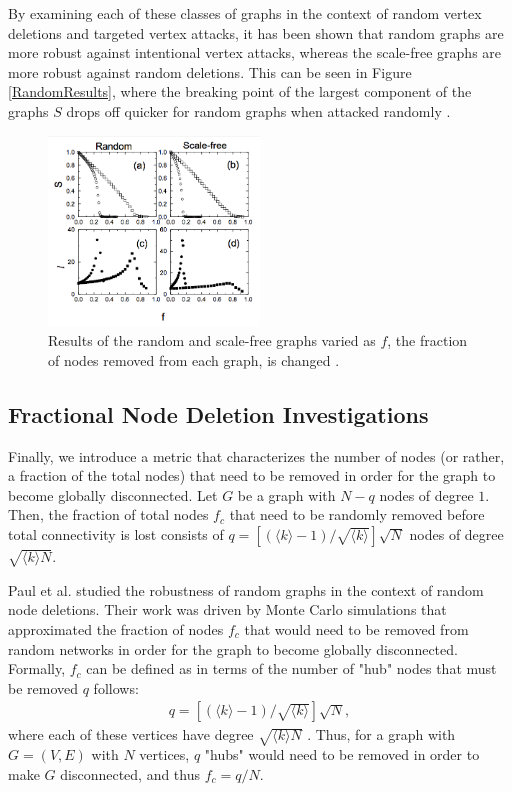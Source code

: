 \documentclass[11pt]{article}
\begin{document}
By examining each of these classes of graphs in the context of random vertex deletions and targeted vertex attacks, it has been shown that random graphs are more robust against intentional vertex attacks, whereas the scale-free graphs are more robust against random deletions. This can be seen in Figure \ref{RandomResults}, where the breaking point of the largest component of the graphs $S$ drops off quicker for random graphs when attacked randomly \cite{GraphThesis}. 

\begin{figure}[h!]
	\label{fig:RandomResults}
	\centering
		\includegraphics[width=0.5\textwidth]{random_results.png}
	\caption{Results of the random and scale-free graphs varied as $f$, the fraction of nodes removed from each graph, is changed \cite{GraphThesis}. }
\end{figure}

\subsection{Fractional Node Deletion Investigations}

Finally, we introduce a metric that characterizes the number of nodes (or rather, a fraction of the total nodes) that need to be removed in order for the graph to become globally disconnected. Let $G$ be a graph with $N - q$ nodes of degree $1$. Then, the fraction of total nodes $f_c$ that need to be randomly removed before total connectivity is lost consists of $q = [(\langle k \rangle - 1) / \sqrt{\langle k \rangle}]\sqrt{N}$ nodes of degree $\sqrt{\langle k \rangle N}$. 

Paul et al. studied the robustness of random graphs in the context of random node deletions. Their work was driven by Monte Carlo simulations that approximated the fraction of nodes $f_c$ that would need to be removed from random networks in order for the graph to become globally disconnected. Formally, $f_c$ can be defined as in terms of the number of "hub" nodes that must be removed $q$ follows:
\begin{eqnarray*}
q = \left[(\langle k \rangle - 1) / \sqrt{\langle k \rangle}\right]\sqrt{N},
\end{eqnarray*}
where each of these vertices have degree $\sqrt{\langle k \rangle N}$ \cite{asd}. Thus, for a graph with $G = (V,E)$ with $N$ vertices, $q$ "hubs" would need to be removed in order to make $G$ disconnected, and thus $f_c = q/N$.
\end{document}
